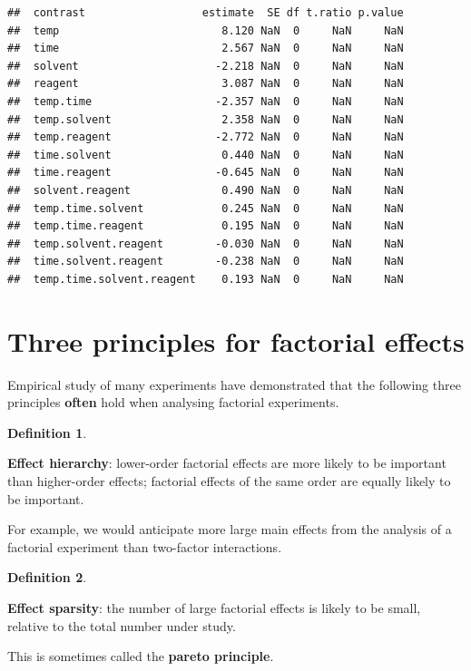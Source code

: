 \documentclass[
]{book}
\theoremstyle{definition}
\newtheorem{definition}{Definition}[chapter]
\theoremstyle{definition}
\theoremstyle{definition}
\theoremstyle{definition}
\theoremstyle{remark}
\begin{document}
\begin{verbatim}
##  contrast                  estimate  SE df t.ratio p.value
##  temp                         8.120 NaN  0     NaN     NaN
##  time                         2.567 NaN  0     NaN     NaN
##  solvent                     -2.218 NaN  0     NaN     NaN
##  reagent                      3.087 NaN  0     NaN     NaN
##  temp.time                   -2.357 NaN  0     NaN     NaN
##  temp.solvent                 2.358 NaN  0     NaN     NaN
##  temp.reagent                -2.772 NaN  0     NaN     NaN
##  time.solvent                 0.440 NaN  0     NaN     NaN
##  time.reagent                -0.645 NaN  0     NaN     NaN
##  solvent.reagent              0.490 NaN  0     NaN     NaN
##  temp.time.solvent            0.245 NaN  0     NaN     NaN
##  temp.time.reagent            0.195 NaN  0     NaN     NaN
##  temp.solvent.reagent        -0.030 NaN  0     NaN     NaN
##  time.solvent.reagent        -0.238 NaN  0     NaN     NaN
##  temp.time.solvent.reagent    0.193 NaN  0     NaN     NaN
\end{verbatim}

\hypertarget{fact-principles}{%
\section{Three principles for factorial effects}\label{fact-principles}}

Empirical study of many experiments \citep{BoxMeyer1986, Li2006} have demonstrated that the following three principles \textbf{often} hold when analysing factorial experiments.

\begin{definition}
\protect\hypertarget{def:effect-hierarchy}{}\label{def:effect-hierarchy}

\textbf{Effect hierarchy}: lower-order factorial effects are more likely to be important than higher-order effects; factorial effects of the same order are equally likely to be important.

For example, we would anticipate more large main effects from the analysis of a factorial experiment than two-factor interactions.

\end{definition}

\begin{definition}
\protect\hypertarget{def:effect-sparsity}{}\label{def:effect-sparsity}

\textbf{Effect sparsity}: the number of large factorial effects is likely to be small, relative to the total number under study.

This is sometimes called the \textbf{pareto principle}.

\end{definition}
\end{document}
